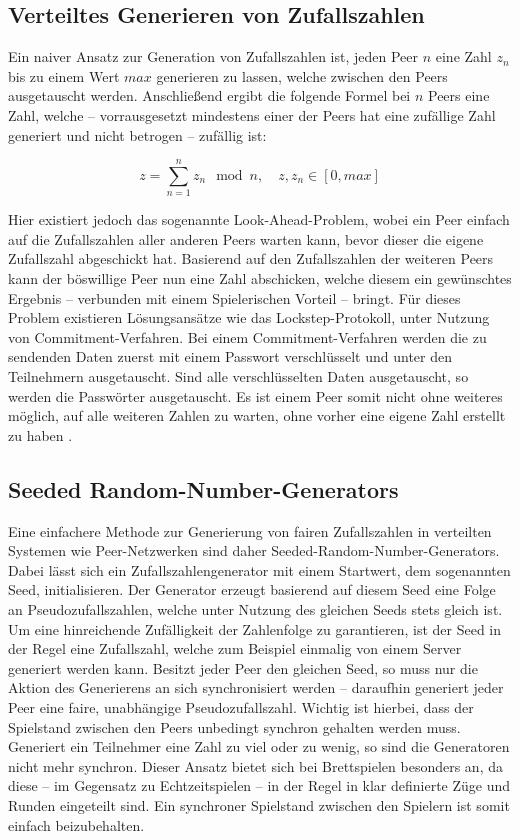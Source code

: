\subsection{Verteiltes Generieren von Zufallszahlen}
Ein naiver Ansatz zur Generation von Zufallszahlen ist, jeden Peer $n$ eine Zahl $z_n$ bis zu einem Wert $max$ generieren zu lassen, welche zwischen den Peers ausgetauscht werden. Anschließend ergibt die folgende Formel bei $n$ Peers eine Zahl, welche -- vorrausgesetzt mindestens einer der Peers hat eine zufällige Zahl generiert und nicht betrogen \cite{rng} -- zufällig ist:

\vspace{-20pt}
\[ z = \sum_{n=1}^{n} z_n \mod n,\quad z, z_n \in [0, max] \]
\vspace{-20pt}

Hier existiert jedoch das sogenannte \glqq{}Look-Ahead-Problem\grqq{}, wobei ein Peer einfach auf die Zufallszahlen aller anderen Peers warten kann, bevor dieser die eigene Zufallszahl abgeschickt hat. Basierend auf den Zufallszahlen der weiteren Peers kann der böswillige Peer nun eine Zahl abschicken, welche diesem ein gewünschtes Ergebnis -- verbunden mit einem Spielerischen Vorteil -- bringt. Für dieses Problem existieren Lösungsansätze wie das \glqq{}Lockstep-Protokoll\grqq{}, unter Nutzung von Commitment-Verfahren. Bei einem Commitment-Verfahren werden die zu sendenden Daten zuerst mit einem Passwort verschlüsselt und unter den Teilnehmern ausgetauscht. Sind alle verschlüsselten Daten ausgetauscht, so werden die Passwörter ausgetauscht. Es ist einem Peer somit nicht ohne weiteres möglich, auf alle weiteren Zahlen zu warten, ohne vorher eine eigene Zahl erstellt zu haben \cite{rng}.\par

\subsection{Seeded Random-Number-Generators}
Eine einfachere Methode zur Generierung von fairen Zufallszahlen in verteilten Systemen wie Peer-Netzwerken sind daher \glqq{}Seeded-Random-Number-Generators\grqq{}. Dabei lässt sich ein Zufallszahlengenerator mit einem Startwert, dem sogenannten \glqq{}Seed\grqq{}, initialisieren. Der Generator erzeugt basierend auf diesem Seed eine Folge an Pseudozufallszahlen, welche unter Nutzung des gleichen Seeds stets gleich ist. Um eine hinreichende Zufälligkeit der Zahlenfolge zu garantieren, ist der Seed in der Regel eine Zufallszahl, welche zum Beispiel einmalig von einem Server generiert werden kann. Besitzt jeder Peer den gleichen Seed, so muss nur die Aktion des Generierens an sich synchronisiert werden -- daraufhin generiert jeder Peer eine faire, unabhängige Pseudozufallszahl. Wichtig ist hierbei, dass der Spielstand zwischen den Peers unbedingt synchron gehalten werden muss. Generiert ein Teilnehmer eine Zahl zu viel oder zu wenig, so sind die Generatoren nicht mehr synchron. Dieser Ansatz bietet sich bei Brettspielen besonders an, da diese -- im Gegensatz zu Echtzeitspielen -- in der Regel in klar definierte \glqq{}Züge\grqq{} und \glqq{}Runden\grqq{} eingeteilt sind. Ein synchroner Spielstand zwischen den Spielern ist somit einfach beizubehalten.\par

